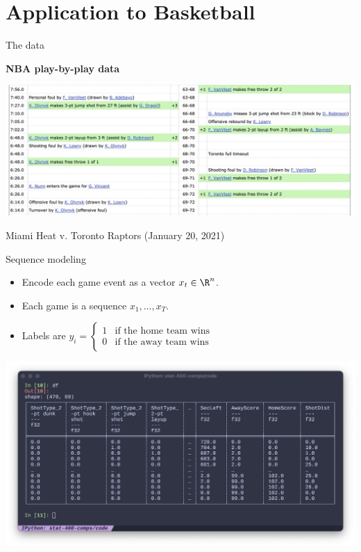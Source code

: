 \section{Application to Basketball}

\begin{frame}{The data}

	\textbf{NBA play-by-play data}

	\medskip

	\includegraphics[width = \textwidth]{bbref-play-by-play.jpg}

	\medskip

	Miami Heat v. Toronto Raptors (January 20, 2021)
\end{frame}

\begin{frame}{Sequence modeling}

	\begin{itemize}[<+->]
		\item Encode each game event as a vector $x_t \in \R^{n}$.
		\item Each game is a sequence $x_1, \ldots, x_T$.
		      \medskip
		\item Labels are $y_i = \begin{cases}
				      1 & \text{if the home team wins} \\
				      0 & \text{if the away team wins}
			      \end{cases}$
	\end{itemize}

	\pause

	\begin{center}
		\includegraphics[width = \textwidth]{play-by-play-encoding.png}
	\end{center}

\end{frame}

